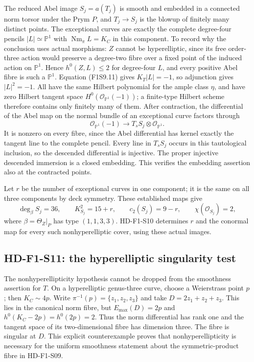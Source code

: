 The reduced Abel image $S_j=a(T_j)$ is smooth and embedded in a
connected norm torsor under the Prym $P$, and $T_j\to S_j$ is the
blowup of finitely many distinct points. The exceptional curves are
exactly the complete degree-four pencils $|L|\simeq\mathbb P^1$ with
$\operatorname{Nm}_\pi L=K_C$ in this component. To record why the
conclusion uses actual morphisms: $Z$ cannot be hyperelliptic, since
its free order-three action would preserve a degree-two fibre over
a fixed point of the induced action on $\mathbb P^1$. Hence
$h^0(Z,L)\leq2$ for degree-four $L$, and every positive Abel fibre
is such a $\mathbb P^1$. Equation (F1S9.11) gives $K_T|L|=-1$,
so adjunction gives $|L|^2=-1$. All have the same Hilbert polynomial
for the ample class $\eta$, and have zero Hilbert tangent space
$H^0(\mathcal O_{\mathbb P^1}(-1))$; a finite-type Hilbert scheme
therefore contains only finitely many of them. After contraction,
the differential of the Abel map on the normal bundle of an
exceptional curve factors through
\[
 \mathcal O_{\mathbb P^1}(-1)
       \longrightarrow T_sS_j\otimes\mathcal O_{\mathbb P^1}.
\]
It is nonzero on every fibre, since the Abel differential has kernel
exactly the tangent line to the complete pencil. Every line in
$T_sS_j$ occurs in this tautological inclusion, so the descended
differential is injective. The proper injective descended immersion
is a closed embedding. This verifies the embedding assertion also
at the contracted points.

Let $r$ be the number of exceptional curves in one component; it is
the same on all three components by deck symmetry. These established
maps give
\[
 \deg_\beta S_j=36,\qquad
 K_{S_j}^2=15+r,\qquad c_2(S_j)=9-r,\qquad
 \chi(\mathcal O_{S_j})=2,
 \tag{F1S9.14}
\]
where $\beta=\Theta_Z|_P$ has type $(1,1,3,3)$.
HD-F1-S10 determines $r$ and the conormal map for every such
nonhyperelliptic cover, using these actual images.

\subsection{HD-F1-S11: the hyperelliptic singularity test}
\label{sec:f1-hyperelliptic-norm-singularity}
The nonhyperellipticity hypothesis cannot be dropped from the
smoothness assertion for $T$. On a hyperelliptic genus-three curve,
choose a Weierstrass point $p$; then $K_C\sim4p$. Write
$\pi^{-1}(p)=\{z_1,z_2,z_3\}$ and take
$D=2z_1+z_2+z_3$. This lies in the canonical norm fibre, but
$E_{\max}(D)=2p$ and
$h^0(K_C-2p)=h^0(2p)=2$. Thus the norm differential has rank one
and the tangent space of its two-dimensional fibre has dimension
three. The fibre is singular at $D$. This explicit counterexample
proves that nonhyperellipticity is necessary for the uniform
smoothness statement about the symmetric-product fibre in HD-F1-S09.
